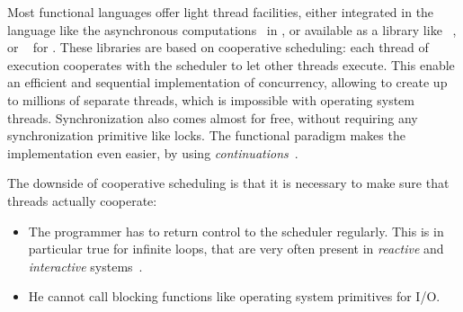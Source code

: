 \documentclass[9pt,preprint]{sigplanconf}
\begin{document}

Most functional languages offer light thread facilities, either integrated in the language like the asynchronous computations~\cite{Syme:2011} in \fsharp, or available as a library like \conhaskell~\cite{Jones:1996}, or \lwt~\cite{Vouillon:2008} for \ocaml. These libraries are based on cooperative scheduling: each thread of execution cooperates with the scheduler to let other threads execute. This enable an efficient and sequential implementation of concurrency, allowing to create up to millions of separate threads, which is impossible with operating system threads. Synchronization also comes almost for free, without requiring any synchronization primitive like locks. The functional paradigm makes the implementation even easier, by using \emph{continuations}~\cite{Claessen:1999}.

The downside of cooperative scheduling is that it is necessary to make sure that threads actually cooperate:
\begin{itemize}
\item The programmer has to return control to the scheduler regularly. This is in particular true for infinite loops, that are very often present in \emph{reactive} and \emph{interactive} systems~\cite{Harel:1985}. 
\item He cannot call blocking functions like operating system primitives for I/O. 
\end{itemize}
\end{document}
